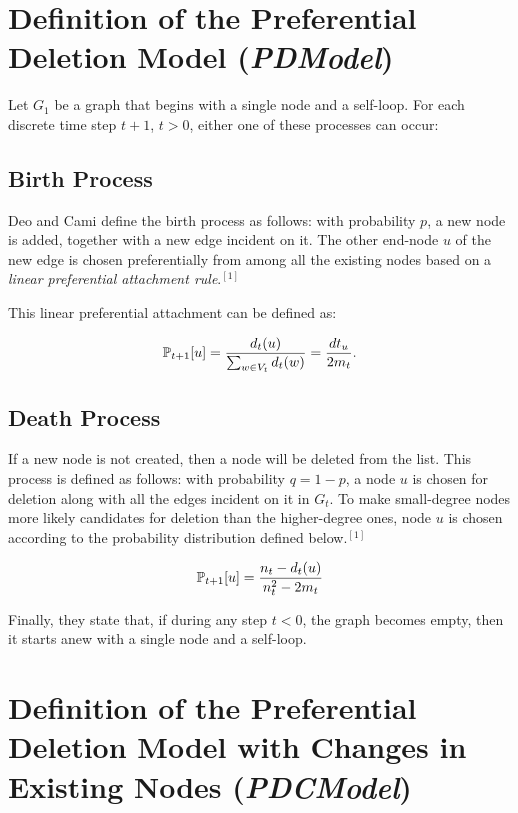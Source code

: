 \documentclass[final,3p,times,twocolumn]{elsarticle}
\begin{document}
\section{Definition of the Preferential Deletion Model (\textit{PDModel})}
\label{S:3}

Let $G_1$ be a graph that begins with a single node and a self-loop. For each discrete time step $t + 1$, $t > 0$, either one of these processes can occur:

\subsection{Birth Process}

Deo and Cami define the birth process as follows: with probability $p$, a new node is added, together with a new edge incident on it. The other end-node $u$ of the new edge is chosen preferentially from among all the existing nodes based on a \textit{linear preferential attachment rule}.$^{[1]}$

This linear preferential attachment can be defined as:

\begin{equation}
\centering
    \mathbb{P}_{t + 1}[u] = \frac{d_t(u)}{\sum_{w \in V_t} d_t(w)} = \frac{dt_u}{2m_t}.
\end{equation}

\subsection{Death Process}

If a new node is not created, then a node will be deleted from the list. This process is defined as follows: with probability $q = 1 - p$, a node $u$ is chosen for deletion along with all the edges incident on it in $G_t$. To make small-degree nodes more likely candidates for deletion than the higher-degree ones, node $u$ is chosen according to the probability distribution defined below.$^{[1]}$

\begin{equation}
\centering
    \mathbb{P}_{t + 1}[u] = \frac{n_t - d_t(u)}{n^2_t - 2m_t}
\end{equation}

Finally, they state that, if during any step $t < 0$, the graph becomes empty, then it starts anew with a single node and a self-loop.

\section{Definition of the Preferential Deletion Model with Changes in Existing Nodes (\textit{PDCModel})}
\end{document}
